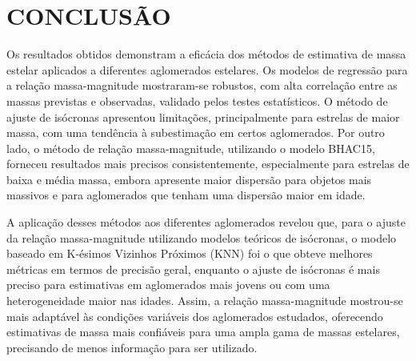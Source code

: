 \chapter{CONCLUSÃO}

Os resultados obtidos demonstram a eficácia dos métodos de estimativa de massa estelar aplicados a diferentes aglomerados estelares. Os modelos de regressão para a relação massa-magnitude mostraram-se robustos, com alta correlação entre as massas previstas e observadas, validado pelos testes estatísticos. O método de ajuste de isócronas apresentou limitações, principalmente para estrelas de maior massa, com uma tendência à subestimação em certos aglomerados. Por outro lado, o método de relação massa-magnitude, utilizando o modelo BHAC15, forneceu resultados mais precisos consistentemente, especialmente para estrelas de baixa e média massa, embora apresente maior dispersão para objetos mais massivos e para aglomerados que tenham uma dispersão maior em idade.

A aplicação desses métodos aos diferentes aglomerados revelou que, para o ajuste da relação massa-magnitude utilizando modelos teóricos de isócronas, o modelo baseado em K-ésimos Vizinhos Próximos (KNN) foi o que obteve melhores métricas em termos de precisão geral, enquanto o ajuste de isócronas é mais preciso para estimativas em aglomerados mais jovens ou com uma heterogeneidade maior nas idades. Assim, a relação massa-magnitude mostrou-se mais adaptável às condições variáveis dos aglomerados estudados, oferecendo estimativas de massa mais confiáveis para uma ampla gama de massas estelares, precisando de menos informação para ser utilizado.